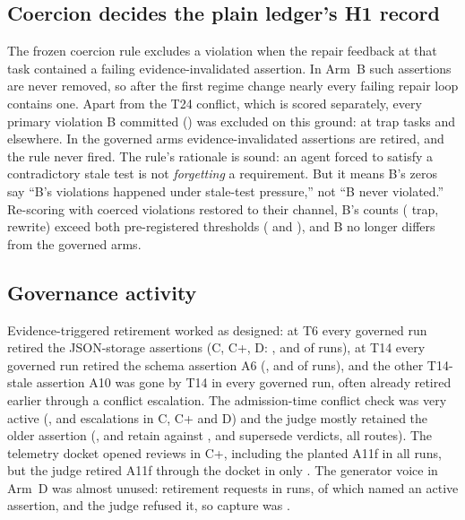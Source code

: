 \documentclass[11pt]{article}
\begin{document}
\subsection{Coercion decides the plain ledger's H1 record}
\label{sec:coercion}

The frozen coercion rule excludes a violation when the repair feedback at that
task contained a failing evidence-invalidated assertion. In Arm~B such
assertions are never removed, so after the first regime change nearly every
failing repair loop contains one. Apart from the T24 conflict, which is scored
separately, every primary violation B committed (\NCoercedB{}) was excluded on
this ground: \NTrapInclCoercedB{} at trap tasks and
\NRewriteInclCoercedB{} elsewhere. In the governed arms evidence-invalidated
assertions are retired, and the rule never fired. The rule's rationale is
sound: an agent forced to satisfy a contradictory stale test is not
\emph{forgetting} a requirement. But it means B's zeros say ``B's violations
happened under stale-test pressure,'' not ``B never violated.'' Re-scoring with
coerced violations restored to their channel, B's counts (\NTrapInclCoercedB{}
trap, \NRewriteInclCoercedB{} rewrite) exceed both pre-registered thresholds
(\NTrapThreshold{} and \NRewriteThreshold), and B no longer differs from the
governed arms.

\subsection{Governance activity}

Evidence-triggered retirement worked as designed: at T6 every governed run
retired the JSON-storage assertions (C, C+, D: \NEOneC, \NEOneCplus{} and
\NEOneD{} of \NSeedsPerArm{} runs), at T14 every governed run retired the
schema assertion A6 (\NETwoASixC, \NETwoASixCplus{} and \NETwoASixD{} of
\NSeedsPerArm{} runs), and the other T14-stale assertion A10 was gone by T14 in every
governed run, often already retired earlier through a conflict escalation. The
admission-time conflict check was very active (\NEscalationsC, \NEscalationsCplus{}
and \NEscalationsD{} escalations in C, C+ and D) and the judge mostly retained
the older assertion (\NRetainC, \NRetainCplus{} and \NRetainD{} retain against
\NSupersedeC, \NSupersedeCplus{} and \NSupersedeD{} supersede verdicts, all
routes). The telemetry docket opened \NDocketCplus{} reviews in C+, including
the planted A11f in all \NPlantDocketedCplus{} runs, but the judge retired A11f
through the docket in only \NPlantTelemetryDocketCplus. The generator voice in
Arm~D was almost unused: \NRetireReqD{} retirement requests in
\NSeedsPerArm{} runs, \NRetireKnownD{} of which named an active assertion, and
the judge refused it, so capture was \NCaptureD.
\end{document}
